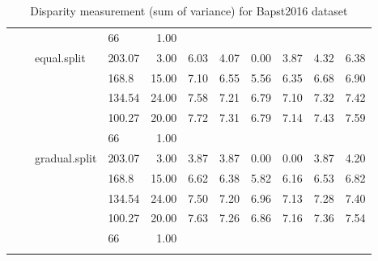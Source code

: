 \begin{longtable}{llllrrrrrrr}
   &  &  & 66 & 1.00 &  &  &  &  &  &  \\ 
   &  & equal.split & 203.07 & 3.00 & 6.03 & 4.07 & 0.00 & 3.87 & 4.32 & 6.38 \\ 
   &  &  & 168.8 & 15.00 & 7.10 & 6.55 & 5.56 & 6.35 & 6.68 & 6.90 \\ 
   &  &  & 134.54 & 24.00 & 7.58 & 7.21 & 6.79 & 7.10 & 7.32 & 7.42 \\ 
   &  &  & 100.27 & 20.00 & 7.72 & 7.31 & 6.79 & 7.14 & 7.43 & 7.59 \\ 
   &  &  & 66 & 1.00 &  &  &  &  &  &  \\ 
   &  & gradual.split & 203.07 & 3.00 & 3.87 & 3.87 & 0.00 & 0.00 & 3.87 & 4.20 \\ 
   &  &  & 168.8 & 15.00 & 6.62 & 6.38 & 5.82 & 6.16 & 6.53 & 6.82 \\ 
   &  &  & 134.54 & 24.00 & 7.50 & 7.20 & 6.96 & 7.13 & 7.28 & 7.40 \\ 
   &  &  & 100.27 & 20.00 & 7.63 & 7.26 & 6.86 & 7.16 & 7.36 & 7.54 \\ 
   &  &  & 66 & 1.00 &  &  &  &  &  &  \\ 
   \hline
\hline
\caption{Disparity measurement (sum of variance) for Bapst2016 dataset} 
\end{longtable}

